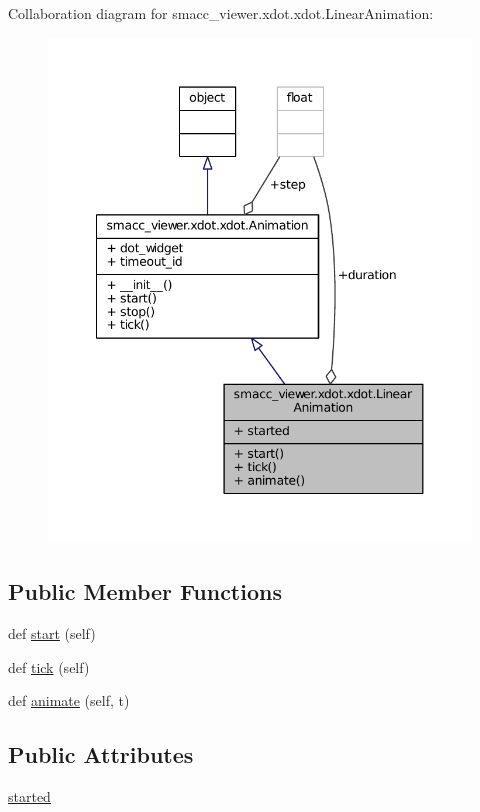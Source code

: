 Collaboration diagram for smacc\+\_\+viewer.\+xdot.\+xdot.\+Linear\+Animation\+:
\nopagebreak
\begin{figure}[H]
\begin{center}
\leavevmode
\includegraphics[width=348pt]{classsmacc__viewer_1_1xdot_1_1xdot_1_1LinearAnimation__coll__graph}
\end{center}
\end{figure}
\subsection*{Public Member Functions}
\begin{DoxyCompactItemize}
\item 
def \hyperlink{classsmacc__viewer_1_1xdot_1_1xdot_1_1LinearAnimation_a118d8d8e3e0ab4967166ba27b04a022f}{start} (self)
\item 
def \hyperlink{classsmacc__viewer_1_1xdot_1_1xdot_1_1LinearAnimation_abb19e464117a6a610e3883d76d491abe}{tick} (self)
\item 
def \hyperlink{classsmacc__viewer_1_1xdot_1_1xdot_1_1LinearAnimation_a371af627e710355cf634f4b566f33914}{animate} (self, t)
\end{DoxyCompactItemize}
\subsection*{Public Attributes}
\begin{DoxyCompactItemize}
\item 
\hyperlink{classsmacc__viewer_1_1xdot_1_1xdot_1_1LinearAnimation_a4b3e538814e2dbaac661cf9fe09e8c68}{started}
\end{DoxyCompactItemize}
